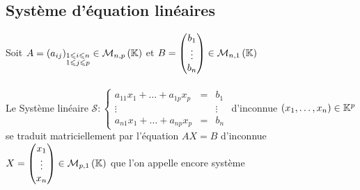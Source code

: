 \subsection{Système d'équation linéaires}
\begin{defprop}
    Soit \(A = \left(a_{ij}\right)_{\substack {1\leqslant i \leqslant n \\ 1\leqslant j \leqslant p}} \in \mathcal{M}_{n,p}\left(\mathbb{K}\right)\) et \(B = \begin{pmatrix}
        b_1 \\ \vdots \\b_n 
    \end{pmatrix} \in \mathcal{M}_{n,1}\left(\mathbb{K}\right)\)\\~\\
    Le Système linéaire \(\mathcal{S} : 
        \left\{
        \begin{array}{rcl}
        a_{11}x_1 + \dots + a_{1p}x_p & = & b_1 \\
        \vdots & & \vdots \\
        a_{n1}x_1 + \dots + a_{np}x_p & = & b_n
        \end{array}
        \right.
        \) d'inconnue \(\left(x_1,\dots,x_n\right) \in \mathbb{K}^p\) se traduit matriciellement par l'équation \(AX = B\) d'inconnue \(X = \begin{pmatrix}
            x_1 \\\vdots\\x_n
        \end{pmatrix} \in \mathcal{M}_{p,1}\left(\mathbb{K}\right)\) que l'on appelle encore système


\end{defprop}
